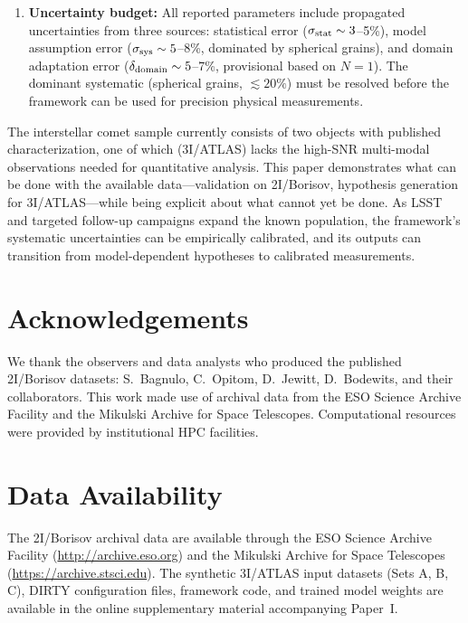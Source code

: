 \documentclass[usenatbib]{mnras}
\begin{document}
\begin{enumerate}
    \item \textbf{Uncertainty budget:} All reported parameters include propagated uncertainties from three sources: statistical error ($\sigma_{\rm stat} \sim 3$--5\%), model assumption error ($\sigma_{\rm sys} \sim 5$--8\%, dominated by spherical grains), and domain adaptation error ($\delta_{\rm domain} \sim 5$--7\%, provisional based on $N=1$). The dominant systematic (spherical grains, $\lesssim 20\%$) must be resolved before the framework can be used for precision physical measurements.
\end{enumerate}

The interstellar comet sample currently consists of two objects with published characterization, one of which (3I/ATLAS) lacks the high-SNR multi-modal observations needed for quantitative analysis. This paper demonstrates what can be done with the available data---validation on 2I/Borisov, hypothesis generation for 3I/ATLAS---while being explicit about what cannot yet be done. As LSST and targeted follow-up campaigns expand the known population, the framework's systematic uncertainties can be empirically calibrated, and its outputs can transition from model-dependent hypotheses to calibrated measurements.

\section*{Acknowledgements}
We thank the observers and data analysts who produced the published 2I/Borisov datasets: S.~Bagnulo, C.~Opitom, D.~Jewitt, D.~Bodewits, and their collaborators. This work made use of archival data from the ESO Science Archive Facility and the Mikulski Archive for Space Telescopes. Computational resources were provided by institutional HPC facilities.

\section*{Data Availability}
The 2I/Borisov archival data are available through the ESO Science Archive Facility (\url{http://archive.eso.org}) and the Mikulski Archive for Space Telescopes (\url{https://archive.stsci.edu}). The synthetic 3I/ATLAS input datasets (Sets A, B, C), DIRTY configuration files, framework code, and trained model weights are available in the online supplementary material accompanying Paper~I.



\end{document}
